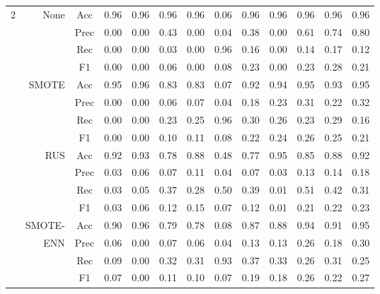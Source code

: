 \begin{table*}
\begin{narrow}{-1cm}{-1cm}
\begin{tabular}{r|r|c|cccccccccc}
2 & None & Acc & 0.96 & 0.96 & 0.96 & 0.96 & 0.06 & 0.96 & 0.96 & 0.96 & 0.96 & 0.96 \\
~ & ~ & Prec & 0.00 & 0.00 & 0.43 & 0.00 & 0.04 & 0.38 & 0.00 & 0.61 & 0.74 & 0.80 \\
~ & ~ & Rec & 0.00 & 0.00 & 0.03 & 0.00 & 0.96 & 0.16 & 0.00 & 0.14 & 0.17 & 0.12 \\
~ & ~ & F1 & 0.00 & 0.00 & 0.06 & 0.00 & 0.08 & 0.23 & 0.00 & 0.23 & 0.28 & 0.21 \\
\cline{2-13}
~ & SMOTE & Acc & 0.95 & 0.96 & 0.83 & 0.83 & 0.07 & 0.92 & 0.94 & 0.95 & 0.93 & 0.95 \\
~ & ~ & Prec & 0.00 & 0.00 & 0.06 & 0.07 & 0.04 & 0.18 & 0.23 & 0.31 & 0.22 & 0.32 \\
~ & ~ & Rec & 0.00 & 0.00 & 0.23 & 0.25 & 0.96 & 0.30 & 0.26 & 0.23 & 0.29 & 0.16 \\
~ & ~ & F1 & 0.00 & 0.00 & 0.10 & 0.11 & 0.08 & 0.22 & 0.24 & 0.26 & 0.25 & 0.21 \\
\cline{2-13}
~ & RUS & Acc & 0.92 & 0.93 & 0.78 & 0.88 & 0.48 & 0.77 & 0.95 & 0.85 & 0.88 & 0.92 \\
~ & ~ & Prec & 0.03 & 0.06 & 0.07 & 0.11 & 0.04 & 0.07 & 0.03 & 0.13 & 0.14 & 0.18 \\
~ & ~ & Rec & 0.03 & 0.05 & 0.37 & 0.28 & 0.50 & 0.39 & 0.01 & 0.51 & 0.42 & 0.31 \\
~ & ~ & F1 & 0.03 & 0.06 & 0.12 & 0.15 & 0.07 & 0.12 & 0.01 & 0.21 & 0.22 & 0.23 \\
\cline{2-13}
~ & SMOTE- & Acc & 0.90 & 0.96 & 0.79 & 0.78 & 0.08 & 0.87 & 0.88 & 0.94 & 0.91 & 0.95 \\
~ & ENN & Prec & 0.06 & 0.00 & 0.07 & 0.06 & 0.04 & 0.13 & 0.13 & 0.26 & 0.18 & 0.30 \\
~ & ~ & Rec & 0.09 & 0.00 & 0.32 & 0.31 & 0.93 & 0.37 & 0.33 & 0.26 & 0.31 & 0.25 \\
~ & ~ & F1 & 0.07 & 0.00 & 0.11 & 0.10 & 0.07 & 0.19 & 0.18 & 0.26 & 0.22 & 0.27 \\
\hline\hline


\end{tabular}
\end{narrow}
\end{table*}
